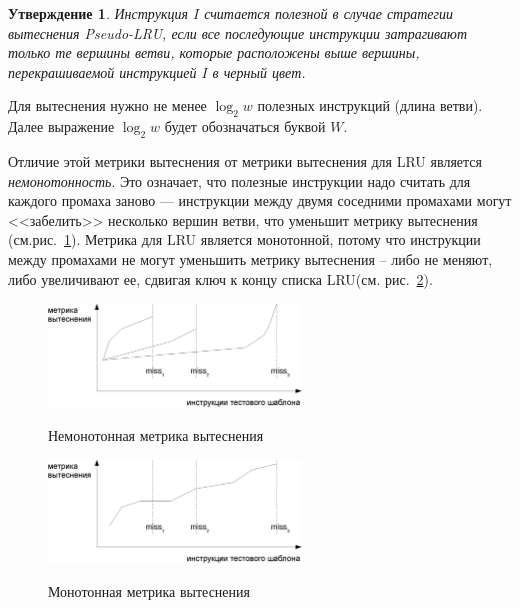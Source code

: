 \documentclass[14pt]{extreport}
\newtheorem{utv}{Утверждение}
\newcommand{\LRU}{\textsf{LRU}\xspace}
\newcommand{\PseudoLRU}{\textsf{Pseudo-LRU}\xspace}
\begin{document}
%

\begin{utv}
Инструкция $I$ считается полезной в случае стратегии вытеснения
\PseudoLRU, если все последующие инструкции затрагивают только те
вершины ветви, которые расположены выше вершины, перекрашиваемой инструкцией $I$ в черный цвет.
\end{utv}

Для вытеснения нужно не менее $\log_2 w$ полезных инструкций (длина ветви). Далее выражение $\log_2 w$ будет обозначаться буквой $W$.

Отличие этой метрики вытеснения от метрики вытеснения для \LRU
является \emph{немонотонность}. Это означает, что полезные
инструкции надо считать для каждого промаха заново ---
инструкции между двумя соседними промахами могут <<забелить>>
несколько вершин ветви, что уменьшит метрику вытеснения
(см.рис.~\ref{nonmonotonic}). Метрика для \LRU является монотонной,
потому что инструкции между промахами не могут уменьшить метрику
вытеснения -- либо не меняют, либо увеличивают ее, сдвигая
ключ к концу списка \LRU (см. рис.~\ref{monotonic}).

\begin{figure}[h] \center
  \includegraphics[width=0.6\textwidth]{2.theor/nonmonotonic}\\
  \caption{Немонотонная метрика вытеснения}\label{nonmonotonic}
\end{figure}

\begin{figure}[h] \center
  \includegraphics[width=0.6\textwidth]{2.theor/monotonic}\\
  \caption{Монотонная метрика вытеснения}\label{monotonic}
\end{figure}
\end{document}
